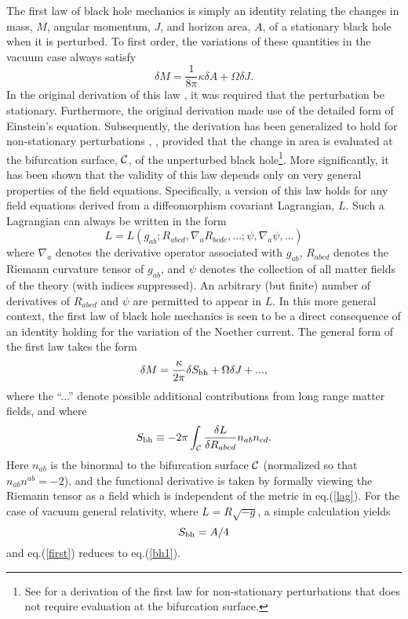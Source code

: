 The first law of black hole mechanics is simply an identity relating
the changes in mass, $M$, angular momentum, $J$, and horizon area,
$A$, of a stationary black hole when it is perturbed. To
first order, the variations of these quantities in the vacuum case
always satisfy
\begin{equation}
\delta M = \frac{1}{8 \pi} \kappa \delta A + \Omega \delta J.
\label{bh1}
\end{equation}
In the original derivation of this law \cite{bch}, it was required
that the perturbation be stationary. Furthermore, the original
derivation made use of the detailed form of Einstein's
equation. Subsequently, the derivation has been generalized to hold
for non-stationary perturbations \cite{sw1}, \cite{iw}, provided that
the change in area is evaluated at the bifurcation surface, ${\cal
C}$, of the unperturbed black hole\footnote{See \cite{sor1} for a
derivation of the first law for non-stationary perturbations that does
not require evaluation at the bifurcation surface.}. More
significantly, it has been shown \cite{iw} that the validity of this
law depends only on very general properties of the field
equations. Specifically, a version of this law holds for any field
equations derived from a diffeomorphism covariant Lagrangian,
$L$. Such a Lagrangian can always be written in the form
\begin{equation}
L = L \left( g_{ab}; R_{abcd}, \nabla_a R_{bcde},
...;\psi, \nabla_a \psi, ...\right)
\label{lag}
\end{equation}
where $\nabla_a$ denotes the derivative operator associated with
$g_{ab}$, $R_{abcd}$ denotes the Riemann curvature tensor of $g_{ab}$,
and $\psi$ denotes the collection of all matter fields of the theory
(with indices suppressed). An arbitrary (but finite) number of
derivatives of $R_{abcd}$ and $\psi$ are permitted to appear in $L$.
In this more general context, the first law of black hole mechanics is
seen to be a direct consequence of an identity holding for the
variation of the Noether current. The general form of the first law
takes the form
\begin{equation}
\delta M = \frac{\kappa}{2 \pi} \delta S_{\rm bh} + \Omega \delta J + ...,
\label{first}
\end{equation}
where the ``...'' denote possible additional contributions from long
range matter fields, and where
\begin{equation}
S_{\rm bh} \equiv -2 \pi \int_{\cal C} \frac{\delta L}{\delta
R_{abcd}} n_{ab} n_{cd}
\label{Sbh} .
\end{equation}
Here $n_{ab}$ is the binormal to the bifurcation surface $\cal C$
(normalized so that $n_{ab} n^{ab} = -2$), and the functional
derivative is taken by formally viewing the Riemann tensor as a field
which is independent of the metric in eq.(\ref{lag}). For the case of
vacuum general relativity, where $L = R \sqrt{-g}$, a simple
calculation yields
\begin{equation}
S_{\rm bh} = A/4 
\label{Sbh2}
\end{equation}
and eq.(\ref{first}) reduces to eq.(\ref{bh1}).

